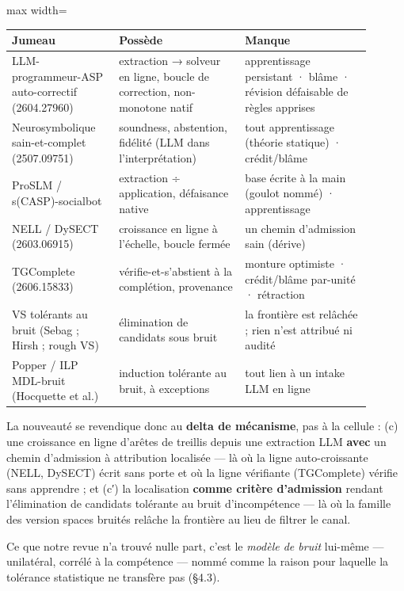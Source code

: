 \documentclass[11pt]{article}
\begin{document}
\begin{center}\small\begin{adjustbox}{max width=\linewidth}\begin{tabular}{>{\raggedright\arraybackslash}p{0.265\linewidth}>{\raggedright\arraybackslash}p{0.318\linewidth}>{\raggedright\arraybackslash}p{0.318\linewidth}}\toprule
Jumeau & Possède & Manque \\ \midrule
LLM-programmeur-ASP auto-correctif (2604.27960) & extraction → solveur en ligne, boucle de correction, non-monotone natif & apprentissage persistant · blâme · révision défaisable de règles apprises \\
Neurosymbolique sain-et-complet (2507.09751) & soundness, abstention, fidélité (LLM dans l'interprétation) & tout apprentissage (théorie statique) · crédit/blâme \\
ProSLM / s(CASP)-socialbot & extraction ÷ application, défaisance native & base écrite à la main (goulot nommé) · apprentissage \\
NELL / DySECT (2603.06915) & croissance en ligne à l'échelle, boucle fermée & un chemin d'admission sain (dérive) \\
TGComplete (2606.15833) & vérifie-et-s'abstient à la complétion, provenance & monture optimiste · crédit/blâme par-unité · rétraction \\
VS tolérants au bruit (Sebag ; Hirsh ; rough VS) & élimination de candidats sous bruit & la frontière est relâchée ; rien n'est attribué ni audité \\
Popper / ILP MDL-bruit (Hocquette et al.) & induction tolérante au bruit, à exceptions & tout lien à un intake LLM en ligne \\
\bottomrule\end{tabular}\end{adjustbox}\end{center}

La nouveauté se revendique donc au \textbf{delta de mécanisme}, pas à la cellule : (c) une croissance en ligne d'arêtes de treillis depuis une extraction LLM \textbf{avec} un chemin d'admission à attribution localisée — là où la ligne auto-croissante (NELL, DySECT) écrit sans porte et où la ligne vérifiante (TGComplete) vérifie sans apprendre ; et (c′) la localisation \textbf{comme critère d'admission} rendant l'élimination de candidats tolérante au bruit d'incompétence — là où la famille des version spaces bruités relâche la frontière au lieu de filtrer le canal.

Ce que notre revue n'a trouvé nulle part, c'est le \emph{modèle de bruit} lui-même — unilatéral, corrélé à la compétence — nommé comme la raison pour laquelle la tolérance statistique ne transfère pas (§4.3).
\end{document}
